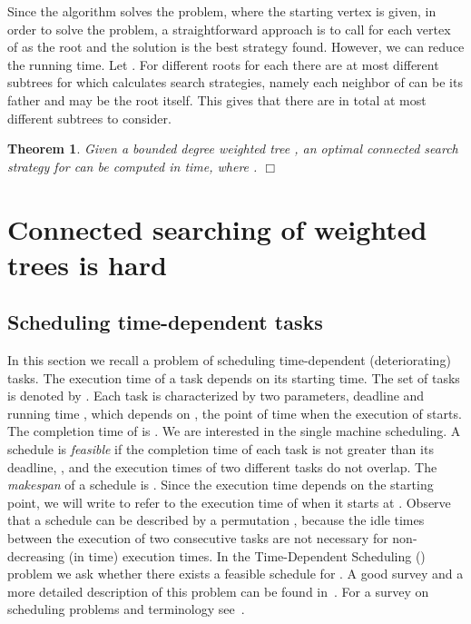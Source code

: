 \documentclass[10pt]{article}
\newcommand{\qed}{\hspace*{\fill}\nolinebreak\ensuremath{\Box}}
\newtheorem{theorem}{Theorem}
\begin{document}
Since the algorithm solves the  problem, where the starting vertex is given, in order to solve the  problem, a straightforward approach is to call  for each vertex of  as the root and the solution is the best strategy found. However, we can reduce the running time. Let . For different roots  for each  there are at most  different subtrees  for which  calculates search strategies, namely each neighbor of  can be its father and  may be the root itself. This gives that there are in total at most  different subtrees  to consider.
\begin{theorem} \label{thm:polynomial_for_trees}
Given a bounded degree weighted tree , an optimal connected search strategy for  can be computed in  time, where .
\qed
\end{theorem}






\section{Connected searching of weighted trees is hard}
\label{sec:hard}

\subsection{Scheduling time-dependent tasks}
\label{subsec:time-dependent}

In this section we recall a problem of scheduling time-dependent (deteriorating) tasks. The execution time of a task depends on its starting time. The set of tasks is denoted by . Each task  is characterized by two parameters, deadline  and running time , which depends on , the point of time when the execution of  starts. The completion time of  is . We are interested in the single machine scheduling. A schedule  is \emph{feasible} if  the completion time   of each task  is not greater than its deadline, , and the execution times of two different tasks do not overlap. The \emph{makespan} of a schedule  is . Since the execution time depends on the starting point, we will write  to refer to the execution time of  when it starts at . Observe that a schedule  can be described by a permutation , because the idle times between the execution of two consecutive tasks are not necessary for non-decreasing (in time) execution times. In the Time-Dependent Scheduling () problem we ask whether there exists a feasible schedule for . A good survey and a more detailed description of this problem can be found in~\cite{deteriorating_survey}. For a survey on scheduling problems and terminology see~\cite{Blazewicz96,Brucker_SchedulingAlgorithms}.
\end{document}
